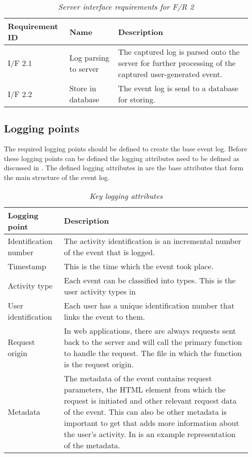 \begin{table}[!htb]
	\centering
	\small
	\caption[Server interface requirements]
	{\textit{Server interface requirements for F/R 2}}
	\label{tbl:Ch2_Server_Interface_Requirements}
	\begin{tabularx}{\textwidth}{|l|l|X|}
		\hline \textbf{Requirement ID} & \textbf{Name} & \textbf{Description} \\
		\hline I/F 2.1 & Log parsing to server & The captured log is parsed onto the server for further processing of the captured user-generated event.\\
		\hline I/F 2.2 & Store in database & The event log is send to a database for storing.\\
		\hline
	\end{tabularx}
\end{table}

\clearpage

\subsection{Logging points}
The required logging points should be defined to create the base event log. Before these logging points can be defined the logging attributes need to be defined as discussed in . The defined logging attributes in  are the base attributes that form the main structure of the event log. 

\begin{table}[!htb]
	\centering
	\small
	\caption[Key logging attributes]
	{\textit{Key logging attributes}}
	\label{tbl:Ch2_KeyLogging_Attributes}
	\begin{tabularx}{\textwidth}{|l|X|}
		\hline \textbf{Logging point} & \textbf{Description} \\
		\hline Identification number & The activity identification is an incremental number of the event that is logged.\\
		\hline Timestamp & This is the time which the event took place.\\
		\hline Activity type & Each event can be classified into types. This is the user activity types in \Cref{tbl:Ch2_User_ActivityTypes} \\
		\hline User identification & Each user has a unique identification number that links the event to them. \\
		\hline Request origin & In web applications, there are always requests sent back to the server and will call the primary function to handle the request. The file in which the function is the request origin. \\
		\hline Metadata & The metadata of the event contains request parameters, the HTML element from which the request is initiated and other relevant request data of the event. This can also be other metadata is important to get that adds more information about the user's activity. In \Cref{fig:Ch2_Metadata_Json_Example} is an example representation of the metadata. \\
		\hline
	\end{tabularx}
\end{table}

